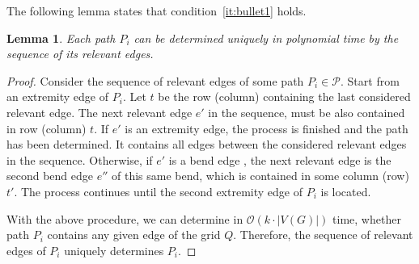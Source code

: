 \documentclass[
submission
]{dmtcs-episciences}
\newtheorem{lemma}[theorem]{Lemma}
\begin{document}

The following lemma states that condition~\ref{it:bullet1} holds. 



\begin{lemma}\label{lem:verify1}
Each path $P_i$ can be determined uniquely in polynomial time by the sequence of its relevant edges.
\end{lemma}



\begin{proof}
Consider the sequence of relevant edges of some path $P_i\in \mathcal{P}$. Start from an extremity edge of $P_i$. Let $t$ be the row (column) containing the last considered relevant edge. The next relevant edge $e'$ in the sequence, must be also contained in row (column) $t$. If $e'$ is an extremity edge, the process is finished and the path has been determined. It contains all edges between the considered relevant edges in the sequence. Otherwise, if $e'$ is a bend edge , the next relevant edge is the second bend edge $e''$ of this same bend, which is contained in some column (row) $t'$. The process continues until the second extremity edge of $P_i$ is located.   

With the above procedure, we can determine in $\mathcal{O}(k\cdot |V(G)|)$ time, whether path $P_i$ contains any given edge of the grid $Q$. Therefore, the sequence of relevant edges of $P_i$ uniquely determines $P_i$.
 \end{proof}
\end{document}
